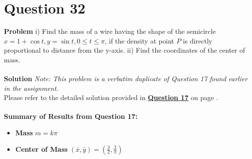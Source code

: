\documentclass{article}
\begin{document}
\section{Question 32}
\textbf{Problem}
i) Find the mass of a wire having the shape of the semicircle $x=1+\cos t, y=\sin t, 0 \le t \le \pi$, if the density at point $P$ is directly proportional to distance from the y-axis.
ii) Find the coordinates of the center of mass.
\\
\\
\textbf{Solution}
\textit{Note: This problem is a verbatim duplicate of Question 17 found earlier
	in the assignment.}
\\
Please refer to the detailed solution provided in
\textbf{\hyperref[sec:q17]{Question 17}} on page \pageref{sec:q17}.
\\
\\
\textbf{Summary of Results from Question 17:}
\begin{itemize}
	\item \textbf{Mass} $m = k\pi$
	\item \textbf{Center of Mass} $(\bar{x}, \bar{y}) = \left( \frac{3}{2}, \frac{2}{\pi} \right)$
\end{itemize}

\pagebreak

\end{document}
